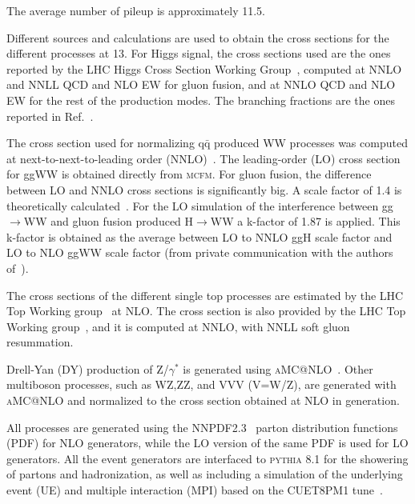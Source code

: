 The average number of pileup is approximately 11.5.


Different sources and calculations are used to obtain the cross sections for the different processes at 13\TeV. 
For Higgs signal, the cross sections used are the ones reported by the LHC Higgs Cross Section Working Group~\cite{temphiggsxsecs},
computed at NNLO and NNLL QCD and NLO EW for gluon fusion, and at NNLO QCD and NLO EW for the rest of the production modes.
The branching fractions are the ones reported in Ref.~\cite{Heinemeyer:2013tqa}. 

The cross section used for normalizing $\mathrm{q\bar q}$ produced WW processes was computed at next-to-next-to-leading order
(NNLO)~\cite{Gehrmann:2014fva}. The leading-order (LO) cross section for ggWW is obtained directly from \textsc{mcfm}.
For gluon fusion, the difference between LO and NNLO cross sections is significantly big.
A scale factor of 1.4 is theoretically calculated~\cite{Caola:2015rqy}. For the LO simulation of the interference between 
gg$\rightarrow$WW and gluon fusion  produced H$\rightarrow$WW a k-factor of 1.87 is applied. 
This k-factor is obtained as the average between LO to NNLO ggH scale factor and LO to NLO ggWW scale factor 
(from private communication with the authors of~\cite{Caola:2015rqy}). 

The cross sections of the different single top processes are estimated by the LHC Top Working group~\cite{singletop} at NLO.
The \ttbar cross section is also provided by the LHC Top Working group~\cite{topxsec}, and it is computed at NNLO, with NNLL soft gluon resummation. 

Drell-Yan (DY) production of Z/$\gamma^{*}$ is generated using \textsc{aMC@NLO}~\cite{Alwall:2014hca}. 
Other multiboson processes, such as WZ,ZZ, and VVV (V=W/Z), are generated with \textsc{aMC@NLO} and normalized
to the cross section obtained at NLO in generation.

All processes are generated using the NNPDF2.3~\cite{Ball:2013hta,Ball:2011uy} parton distribution functions (PDF) for NLO generators,
while the LO version of the same PDF is used for LO generators. All the event generators are interfaced 
to \textsc{pythia} 8.1 for the showering of partons and hadronization, as well as including a simulation of the 
underlying event (UE) and multiple interaction (MPI) based on the CUET8PM1 tune~\cite{Khachatryan:2015pea}. 
